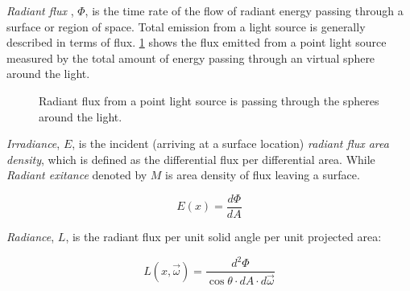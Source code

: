\emph{Radiant flux} , \(\Phi\), is the time rate of the flow of radiant energy passing through a surface or region of space. Total emission from a light source is generally described in terms of flux. \ref{fig:flux_point_light} shows the flux emitted from a point light source measured by the total amount of energy passing through an virtual sphere around the light. 

\begin{figure}[htp] 
    \centering 
    \renewcommand{\thefigure}{\thechapter.\arabic{figure}}
    \caption[]{Radiant flux from a point light source is passing through the spheres around the light.}
    \label{fig:flux_point_light} 
\end{figure} 

\emph{Irradiance}, \(E\), is the incident (arriving at a surface location) \emph{radiant flux area density}, which is defined as the differential flux per differential area. While \emph{Radiant exitance} denoted by \(M\) is area density of flux leaving a surface.  

\begin{equation}
E(x) = \frac{d\Phi}{dA}
\end{equation}

\emph{Radiance}, \(L\), is the radiant flux per unit solid angle per unit projected area: 

\begin{equation}
L(x, \overrightarrow{\omega}) = \frac{d^{2}\Phi}{\cos{\theta} \cdot dA \cdot d\overrightarrow{\omega}}
\end{equation}

